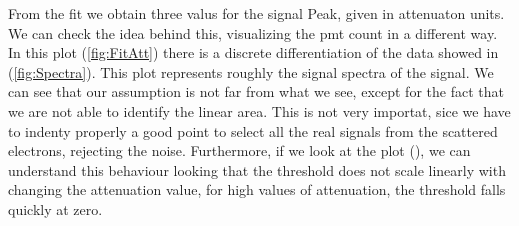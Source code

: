 {\begin{figure}[hbtp]
\centering
{}
\end{figure}

From the fit we obtain three valus for the signal Peak, given in attenuaton units.
We can check the idea behind this, visualizing the pmt count in a different way. In this plot (\ref{fig:FitAtt}) there is a discrete differentiation of the data showed in (\ref{fig:Spectra}). This plot represents roughly the signal spectra of the signal. 
We can see that our assumption is not far from what we see, except for the fact that we are not able to identify the linear area. This is not very importat, sice we have to indenty properly a good point to select all the real signals from the scattered electrons, rejecting the noise. Furthermore, if we look at the plot (), we can understand this behaviour looking that the threshold does not scale linearly with changing the attenuation value, for high values of attenuation, the threshold falls quickly at zero.

}
